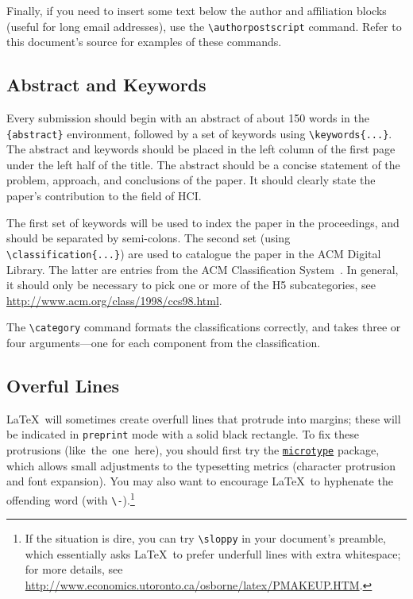 \documentclass[preprint]{../latex/sigchi-modern}
\begin{document}
Finally, if you need to insert some text below the author and affiliation
blocks (useful for long email addresses), use the
\texttt{\textbackslash authorpostscript} command. Refer to this document's
source for examples of these commands.

\subsection{Abstract and Keywords}
Every submission should begin with an abstract of about 150 words in the
\texttt{\{abstract\}} environment, followed by a set of keywords using
\texttt{\textbackslash keywords\{...\}}. The abstract and keywords should be
placed in the left column of the first page under the left half of the title.
The abstract should be a concise statement of the problem, approach, and
conclusions of the paper. It should clearly state the paper's contribution to
the field of HCI.

The first set of keywords will be used to index the paper in the proceedings,
and should be separated by semi-colons. The second set (using
\texttt{\textbackslash classification\{...\}}) are used to catalogue the paper
in the ACM Digital Library. The latter are entries from the ACM Classification
System~\cite{acm_categories}. In general, it should only be necessary to pick
one or more of the H5 subcategories, see
\url{http://www.acm.org/class/1998/ccs98.html}.

The \texttt{\textbackslash category} command formats the classifications 
correctly, and takes three or four arguments---one for each component from the
classification.

\subsection{Overful Lines}
\LaTeX\ will sometimes create overfull lines that protrude into margins; these
will be indicated in \texttt{preprint} mode with a solid black rectangle. To fix
these protrusions (like~the~one~here), you should first try the
\href{http://ctan.org/pkg/microtype}{\texttt{microtype}} package, which allows
small adjustments to the typesetting metrics (character protrusion and font
expansion). You may also want to encourage \LaTeX\ to hyphenate the offending
word (with \texttt{\textbackslash -}).\footnote{If the situation is dire, you 
can try \texttt{\textbackslash sloppy} in your document's preamble, which
essentially asks \LaTeX\ to prefer underfull lines with extra whitespace; for
more details, see
\url{http://www.economics.utoronto.ca/osborne/latex/PMAKEUP.HTM}.}
\end{document}
